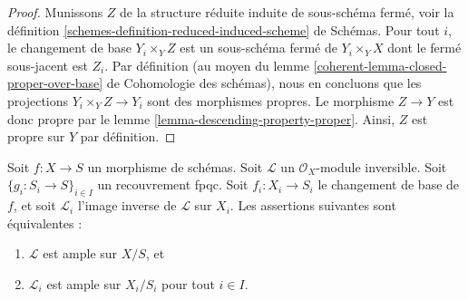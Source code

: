 \begin{proof}
Munissons $Z$ de la structure réduite induite de sous-schéma fermé, voir la
définition \ref{schemes-definition-reduced-induced-scheme} de Schémas.
Pour tout $i$, le changement de base $Y_i \times_Y Z$ est un sous-schéma
fermé de $Y_i \times_Y X$ dont le fermé sous-jacent est $Z_i$.
Par définition (au moyen du lemme
\ref{coherent-lemma-closed-proper-over-base} de Cohomologie des schémas),
nous en concluons que les projections $Y_i \times_Y Z \to Y_i$ sont des
morphismes propres. Le morphisme $Z \to Y$ est donc propre par le
lemme \ref{lemma-descending-property-proper}.
Ainsi, $Z$ est propre sur $Y$ par définition.
\end{proof}

\begin{lemma}
\label{lemma-descending-property-ample}
Soit $f : X \to S$ un morphisme de schémas.
Soit $\mathcal{L}$ un $\mathcal{O}_X$-module inversible.
Soit $\{g_i : S_i \to S\}_{i \in I}$ un recouvrement fpqc.
Soit $f_i : X_i \to S_i$ le changement de base de $f$, et soit
$\mathcal{L}_i$ l'image inverse de $\mathcal{L}$ sur $X_i$.
Les assertions suivantes sont équivalentes :
\begin{enumerate}
\item $\mathcal{L}$ est ample sur $X/S$, et
\item $\mathcal{L}_i$ est ample sur $X_i/S_i$
pour tout $i \in I$.
\end{enumerate}
\end{lemma}

